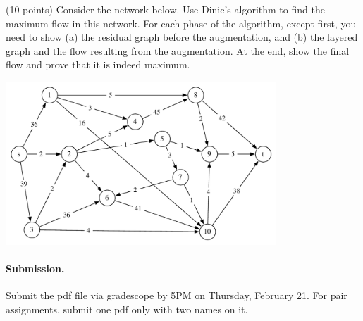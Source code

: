 \documentclass[11pt]{article}
\begin{document}


\begin{problem} (10 points)
Consider the network below.
Use Dinic's algorithm to find the maximum flow
in this network. For each phase of the
algorithm, except first, you need to show (a) the residual graph before the
augmentation, and (b) the layered graph and the flow resulting from the
augmentation. At the end, show the
final flow and prove that it is indeed maximum.

\noindent
\begin{center}
\includegraphics[width=4in]{hw3_dinic.pdf} %
\end{center}
\end{problem}


\vskip 0.2in
\paragraph{Submission.}
Submit the pdf file via gradescope by 5PM on Thursday, February 21.
For pair assignments, submit one pdf only with two names on it.
\end{document}
